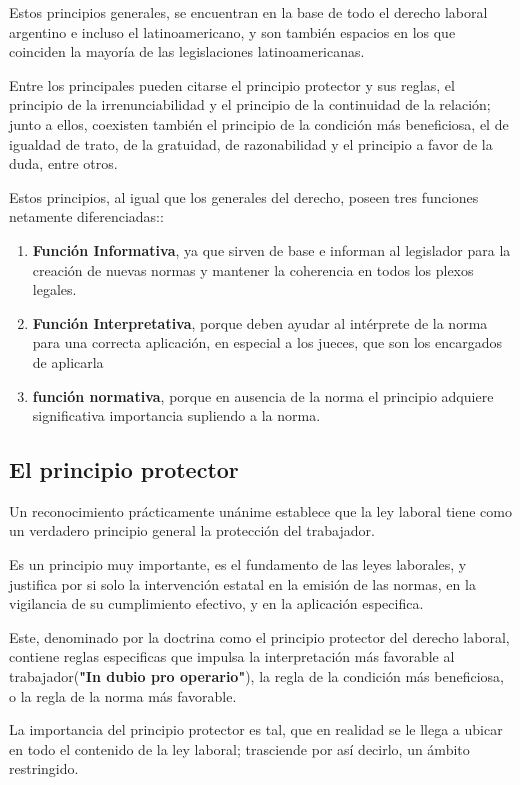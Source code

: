 \documentclass[a4paper]{article}
\begin{document}
Estos principios generales, se encuentran en la base de todo el derecho laboral argentino e incluso el latinoamericano, y son también espacios en los que coinciden la mayoría de las legislaciones latinoamericanas.\cite{Terrasa2017}

Entre los principales pueden citarse el principio protector y sus reglas, el principio de la irrenunciabilidad y el principio de la continuidad de la relación; junto a ellos, coexisten también el principio de la condición más beneficiosa, el de igualdad de trato, de la gratuidad, de razonabilidad y el principio a favor de la duda, entre otros. 

Estos principios, al igual que los generales del derecho, poseen tres funciones netamente diferenciadas:\cite{Orsini2010}:
\begin{enumerate}
\item \textbf{Función Informativa}, ya que sirven de base e informan al legislador para la creación de nuevas normas y mantener la coherencia en todos los plexos legales.
\item \textbf{Función Interpretativa}, porque deben ayudar al intérprete de la norma para una correcta aplicación, en especial a los jueces, que son los encargados de aplicarla
\item \textbf{función normativa},  porque en ausencia de la norma el principio adquiere significativa importancia supliendo a la norma.
\end{enumerate}


\subsection{El principio protector}
Un reconocimiento prácticamente unánime establece que la ley laboral tiene como un verdadero principio general la protección del trabajador. 

Es un principio muy importante, es el fundamento de las leyes laborales, y justifica por si solo la intervención estatal en la emisión de las normas, en la vigilancia de su cumplimiento efectivo, y en la aplicación especifica. 

Este, denominado por la doctrina como el principio protector del derecho laboral, contiene  reglas especificas que impulsa la interpretación más favorable al trabajador(\textbf{"In dubio pro operario"}), la regla de la condición más beneficiosa, o la regla de la norma más favorable. 

La importancia del principio protector es tal, que en realidad se le llega a ubicar en todo el contenido de la ley laboral; trasciende por así decirlo, un ámbito restringido. 
\end{document}
